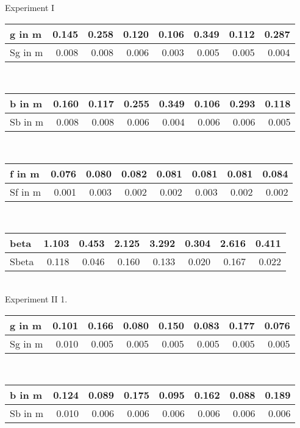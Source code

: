 Experiment I \\ \bigskip\normalsize
	\begin{tabular}{| l | r|r|r|r|r|r|r|}
	\hline
        g in m& 0.145 & 0.258 & 0.120 & 0.106 & 0.349 & 0.112 & 0.287 \\ \hline Sg in m& 0.008 & 0.008 & 0.006 & 0.003 & 0.005 & 0.005 & 0.004 \\ \hline
	\end{tabular} \\ \bigskip
	\bigskip\normalsize
	\begin{tabular}{| l | r|r|r|r|r|r|r|}
	\hline
        b in m& 0.160 & 0.117 & 0.255 & 0.349 & 0.106 & 0.293 & 0.118 \\ \hline Sb in m& 0.008 & 0.008 & 0.006 & 0.004 & 0.006 & 0.006 & 0.005 \\ \hline
	\end{tabular} \\ \bigskip
	\bigskip\normalsize
	\begin{tabular}{| l | r|r|r|r|r|r|r|}
	\hline
        f in m& 0.076 & 0.080 & 0.082 & 0.081 & 0.081 & 0.081 & 0.084 \\ \hline Sf in m& 0.001 & 0.003 & 0.002 & 0.002 & 0.003 & 0.002 & 0.002 \\ \hline
	\end{tabular} \\ \bigskip
	\bigskip\normalsize
	\begin{tabular}{| l | r|r|r|r|r|r|r|}
	\hline
        beta& 1.103 & 0.453 & 2.125 & 3.292 & 0.304 & 2.616 & 0.411 \\ \hline Sbeta& 0.118 & 0.046 & 0.160 & 0.133 & 0.020 & 0.167 & 0.022 \\ \hline
	\end{tabular} \\ \bigskip
	Experiment II 1. \\ \bigskip\normalsize
	\begin{tabular}{| l | r|r|r|r|r|r|r|}
	\hline
        g in m& 0.101 & 0.166 & 0.080 & 0.150 & 0.083 & 0.177 & 0.076 \\ \hline Sg in m& 0.010 & 0.005 & 0.005 & 0.005 & 0.005 & 0.005 & 0.005 \\ \hline
	\end{tabular} \\ \bigskip
	\bigskip\normalsize
	\begin{tabular}{| l | r|r|r|r|r|r|r|}
	\hline
        b in m& 0.124 & 0.089 & 0.175 & 0.095 & 0.162 & 0.088 & 0.189 \\ \hline Sb in m& 0.010 & 0.006 & 0.006 & 0.006 & 0.006 & 0.006 & 0.006 \\ \hline
	\end{tabular} \\ \bigskip
